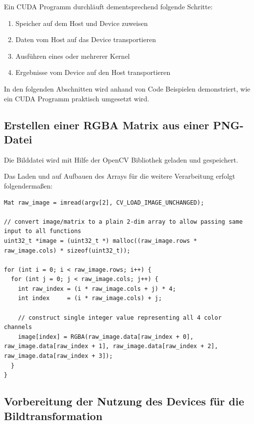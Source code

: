 \documentclass{llncs}
\begin{document}
Ein CUDA Programm durchläuft dementsprechend folgende Schritte:
\begin{enumerate}
	\item Speicher auf dem Host und Device zuweisen
	\item Daten vom Host auf das Device transportieren
	\item Ausführen eines oder mehrerer Kernel
	\item Ergebnisse vom Device auf den Host transportieren
\end{enumerate}

In den folgenden Abschnitten wird anhand von Code Beispielen demonstriert, wie ein CUDA Programm praktisch umgesetzt wird.\\

%
\subsection{Erstellen einer RGBA Matrix aus einer PNG-Datei}
%
Die Bilddatei wird mit Hilfe der OpenCV Bibliothek geladen und gespeichert.

Das Laden und auf Aufbauen des Arrays für die weitere Verarbeitung erfolgt folgendermaßen:

\begin{lstlisting}
Mat raw_image = imread(argv[2], CV_LOAD_IMAGE_UNCHANGED);

// convert image/matrix to a plain 2-dim array to allow passing same input to all functions
uint32_t *image = (uint32_t *) malloc((raw_image.rows * raw_image.cols) * sizeof(uint32_t));

for (int i = 0; i < raw_image.rows; i++) {
  for (int j = 0; j < raw_image.cols; j++) {
    int raw_index = (i * raw_image.cols + j) * 4;
    int index     = (i * raw_image.cols) + j;

    // construct single integer value representing all 4 color channels
    image[index] = RGBA(raw_image.data[raw_index + 0], raw_image.data[raw_index + 1], raw_image.data[raw_index + 2], raw_image.data[raw_index + 3]);
  }
}
\end{lstlisting}

%
\subsection{Vorbereitung der Nutzung des Devices für die Bildtransformation}
%
\end{document}
